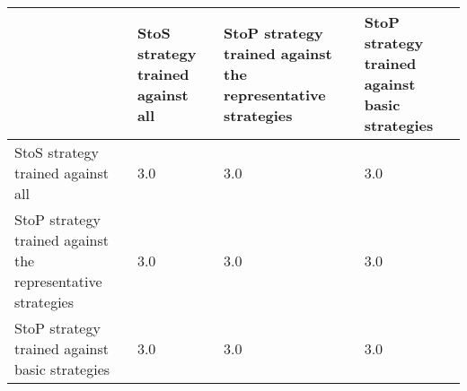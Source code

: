 \begin{tabular}{lP{0.25\textwidth}P{0.27\textwidth}P{0.27\textwidth}}
\toprule
{} &  StoS strategy trained against all &  StoP strategy trained against the representative strategies &  StoP strategy trained against basic strategies \\
\midrule
StoS strategy trained against all                &                                3.0 &                                               3.0 &                                             3.0 \\
StoP strategy trained against the representative strategies &                                3.0 &                                               3.0 &                                             3.0 \\
StoP strategy trained against basic strategies   &                                3.0 &                                               3.0 &                                             3.0 \\
\bottomrule
\end{tabular}
